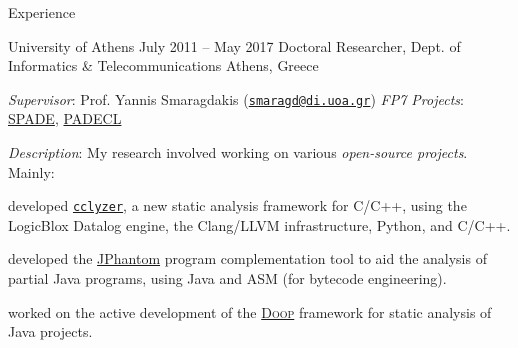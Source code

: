 \documentclass{resume}
\begin{document}
\begin{rSection}{Experience}
\begin{rSubsection}
  {University of Athens}
  {July 2011 -- May 2017}
  {Doctoral Researcher, Dept. of Informatics \& Telecommunications}
  {Athens, Greece}
\item \emph{Supervisor}: Prof. Yannis Smaragdakis
  (\href{mailto:smaragd@di.uoa.gr}{\nolinkurl{smaragd@di.uoa.gr}})
  \hfill{%
  \emph{FP7 Projects}:
  \href{http://cordis.europa.eu/project/rcn/104361_en.html}{SPADE},
  \href{http://cordis.europa.eu/project/rcn/95729_en.html}{PADECL}}
\item \emph{Description}: My research involved working on various
  \emph{open-source projects}. Mainly: \vspace{-0.5em}
  \begin{compactitem}[--]
  \item developed
    \href{https://github.com/plast-lab/cclyzer}{\texttt{cclyzer}}, a new static
    analysis framework for C/C++, using the LogicBlox Datalog engine,
    the Clang/LLVM infrastructure, Python, and C/C++.
  \item developed the
    \href{https://github.com/gbalats/jphantom}{JPhantom} program
    complementation tool to aid the analysis of partial Java programs,
    using Java and ASM (for bytecode engineering).
  \item worked on the active development of the
    \href{https://bitbucket.org/yanniss/doop}{\textsc{Doop}}
    framework for static analysis of Java projects.
  \end{compactitem}
\end{rSubsection}



\end{rSection}
\end{document}
